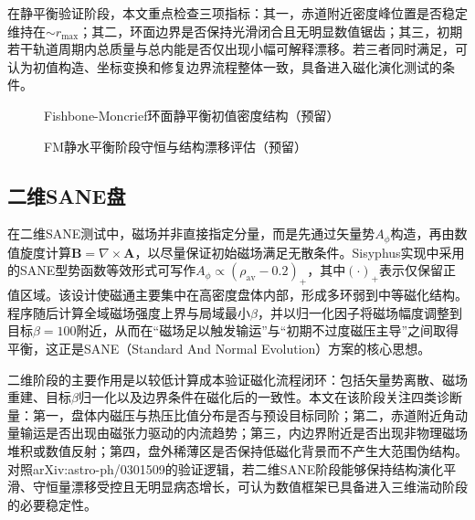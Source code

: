 在静平衡验证阶段，本文重点检查三项指标：其一，赤道附近密度峰位置是否稳定维持在$\sim r_{\max}$；其二，环面边界是否保持光滑闭合且无明显数值锯齿；其三，初期若干轨道周期内总质量与总内能是否仅出现小幅可解释漂移。若三者同时满足，可认为初值构造、坐标变换和修复边界流程整体一致，具备进入磁化演化测试的条件。

\begin{figure}[htbp]
	\centering
	\caption{Fishbone-Moncrief环面静平衡初值密度结构（预留）}
	\label{fig:fm-hydro-init-placeholder}
\end{figure}

\begin{figure}[htbp]
	\centering
	\caption{FM静水平衡阶段守恒与结构漂移评估（预留）}
	\label{fig:fm-hydro-balance-placeholder}
\end{figure}

\subsection{二维SANE盘}
在二维SANE测试中，磁场并非直接指定分量，而是先通过矢量势$A_\phi$构造，再由数值旋度计算$\mathbf{B}=\nabla\times\mathbf{A}$，以尽量保证初始磁场满足无散条件。Sisyphus实现中采用的SANE型势函数等效形式可写作$A_\phi\propto(\rho_{\mathrm{av}}-0.2)_+$，其中$(\cdot)_+$表示仅保留正值区域。该设计使磁通主要集中在高密度盘体内部，形成多环弱到中等磁化结构。程序随后计算全域磁场强度上界与局域最小$\beta$，并以归一化因子将磁场幅度调整到目标$\beta=100$附近，从而在“磁场足以触发输运”与“初期不过度磁压主导”之间取得平衡，这正是SANE（Standard And Normal Evolution）方案的核心思想。

二维阶段的主要作用是以较低计算成本验证磁化流程闭环：包括矢量势离散、磁场重建、目标$\beta$归一化以及边界条件在磁化后的一致性。本文在该阶段关注四类诊断量：第一，盘体内磁压与热压比值分布是否与预设目标同阶；第二，赤道附近角动量输运是否出现由磁张力驱动的内流趋势；第三，内边界附近是否出现非物理磁场堆积或数值反射；第四，盘外稀薄区是否保持低磁化背景而不产生大范围伪结构。对照arXiv:astro-ph/0301509的验证逻辑，若二维SANE阶段能够保持结构演化平滑、守恒量漂移受控且无明显病态增长，可认为数值框架已具备进入三维湍动阶段的必要稳定性。

